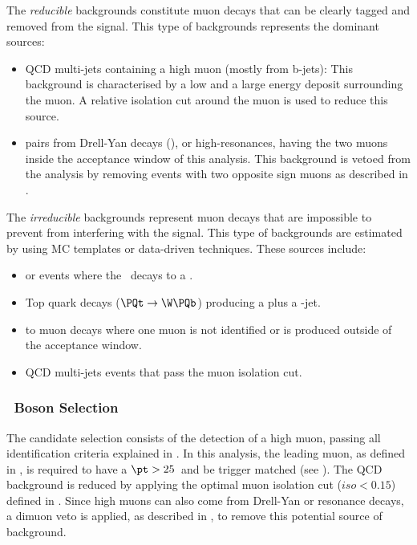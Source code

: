 The \emph{reducible} backgrounds constitute muon decays that can be clearly tagged and removed from the signal. This type of backgrounds represents the dominant sources:

\begin{itemize}
\item QCD multi-jets containing a high \pt muon (mostly from b-jets): This background is characterised by a low \ETslash and a large energy deposit surrounding the muon. A relative isolation cut around the muon is used to reduce this source.
\item \mumu pairs from Drell-Yan decays (\DY), or high-\pt resonances, having the two muons inside the acceptance window of this analysis. This background is vetoed from the analysis by removing events with two opposite sign muons as described in .
\end{itemize}

The \emph{irreducible} backgrounds represent muon decays that are impossible to prevent from interfering with the signal. This type of backgrounds are estimated by using MC templates or data-driven techniques. These sources include:

\begin{itemize}
\item \WToTauNu or \DYToTauTau events where the \PGt\ decays to a \PGm.
\item Top quark decays ($\PQt\to\W\PQb$) producing a \W plus a \PQb-jet.
\item \DY to muon decays where one muon is not identified or is produced outside of the acceptance window.
\item QCD multi-jets events that pass the muon isolation cut.
\end{itemize}


\subsubsection{\PW\ Boson Selection} \label{sec:WBoson_Analysis_WSelection}

The \W candidate selection consists of the detection of a high \pt muon, passing all identification criteria explained in . In this analysis, the leading muon, as defined in , is required to have a $\pt > 25$~\GeVc and be trigger matched (see ). The QCD background is reduced by applying the optimal muon isolation cut ($iso < 0.15$) defined in . Since high \pt muons can also come from Drell-Yan or resonance decays, a dimuon veto is applied, as described in , to remove this potential source of background.

